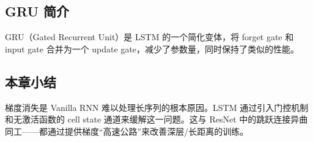 \subsection{GRU 简介}

GRU（Gated Recurrent Unit）是 LSTM 的一个简化变体，将 forget gate 和 input gate 合并为一个 update gate，减少了参数量，同时保持了类似的性能。

\subsection{本章小结}

梯度消失是 Vanilla RNN 难以处理长序列的根本原因。LSTM 通过引入门控机制和无激活函数的 cell state 通道来缓解这一问题。这与 ResNet 中的跳跃连接异曲同工——都通过提供梯度``高速公路''来改善深层/长距离的训练。


